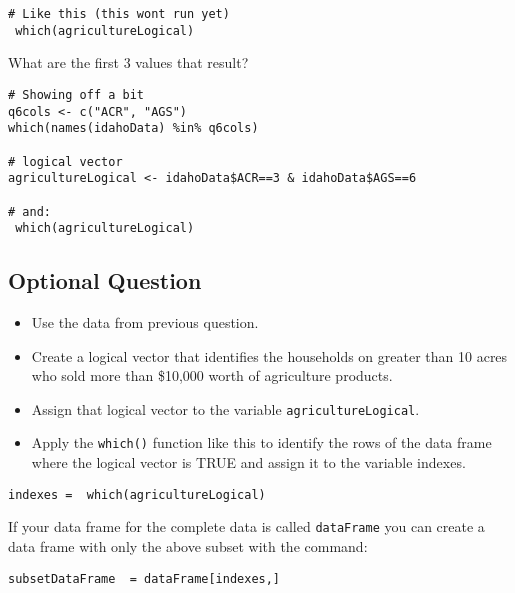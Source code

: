 \documentclass[]{article}
\begin{document}
\begin{framed} 
\begin{verbatim}
# Like this (this wont run yet)
 which(agricultureLogical) 
\end{verbatim}
\end{framed} 

What are the first 3 values that result?

\begin{framed} \begin{verbatim}
# Showing off a bit
q6cols <- c("ACR", "AGS")
which(names(idahoData) %in% q6cols)  

# logical vector
agricultureLogical <- idahoData$ACR==3 & idahoData$AGS==6

# and:
 which(agricultureLogical) 
\end{verbatim}\end{framed} 


\newpage
\subsection*{Optional Question}

\begin{itemize}
\item Use the data from previous question. 
\item Create a logical vector that identifies the households on greater than 10 acres who
 sold more than \$10,000 worth of agriculture products. 
\item Assign that logical vector to the variable \texttt{agricultureLogical}. 
\item Apply the \texttt{which()} function like this to identify the rows of the 
data frame where the logical vector is TRUE and assign it to the variable indexes. 
\end{itemize}

\begin{framed} \begin{verbatim}
indexes =  which(agricultureLogical) 
\end{verbatim}\end{framed} 

If your data frame for the complete data is called \texttt{dataFrame} you can create a data frame 
with only the above subset with the command: 

\begin{framed} 
\begin{verbatim}
subsetDataFrame  = dataFrame[indexes,] 
\end{verbatim}
\end{framed} 
\end{document}
